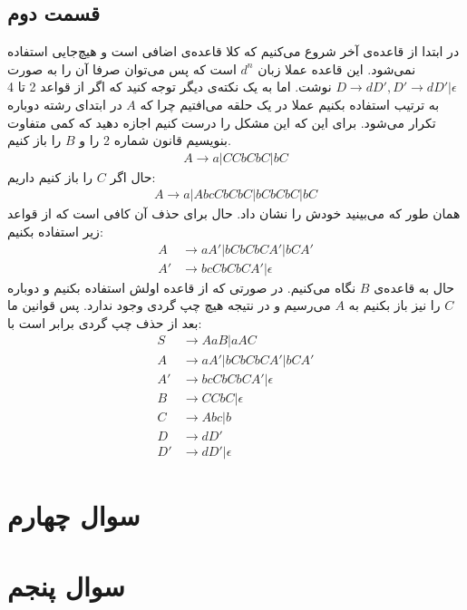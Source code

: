\documentclass[]{article}
\begin{document}
\subsection*{قسمت دوم}
در ابتدا از قاعده‌ی آخر شروع می‌کنیم که کلا قاعده‌ی اضافی است و هیچ‌جایی استفاده نمی‌شود.
این قاعده عملا زبان
$d^n$
است که پس می‌توان صرفا آن را به صورت
$D \rightarrow dD', D' \rightarrow dD' | \epsilon$
نوشت. اما به یک نکته‌ی دیگر توجه کنید که اگر از قواعد 2 تا 4 به ترتیب استفاده بکنیم عملا
در یک حلقه می‌افتیم چرا که
$A$
در ابتدای رشته دوباره تکرار می‌شود. برای این که این مشکل را درست کنیم اجازه
دهید که کمی متفاوت بنویسیم قانون شماره 2 را و
$B$
را باز کنیم.
\begin{gather*}
    A \rightarrow a | CCbCbC | bC
\end{gather*}
حال اگر
$C$
را باز کنیم داریم:
\begin{gather*}
    A \rightarrow a | AbcCbCbC | bCbCbC | bC
\end{gather*}
همان طور که می‌بینید
خودش را نشان داد. حال برای حذف آن کافی است که از قواعد زیر استفاده بکنیم:
\begin{align*}
    A &\rightarrow aA' | bCbCbCA' | bCA'\\
    A' &\rightarrow bcCbCbCA' | \epsilon
\end{align*}
حال به قاعده‌ی
$B$
نگاه می‌کنیم. در صورتی که از قاعده اولش استفاده بکنیم و دوباره
$C$
را نیز باز بکنیم به
$A$
می‌رسیم و در نتیجه هیچ چپ گردی وجود ندارد. پس قوانین ما بعد از حذف چپ گردی برابر است با:
\begin{align*}
    S &\rightarrow AaB | aAC\\
    A &\rightarrow aA' | bCbCbCA' | bCA'\\
    A' &\rightarrow bcCbCbCA' | \epsilon\\
    B &\rightarrow CCbC | \epsilon\\
    C &\rightarrow Abc | b\\
    D &\rightarrow dD'\\
    D' &\rightarrow dD' | \epsilon
\end{align*}
\section*{سوال چهارم}
\section*{سوال پنجم}
\end{document}
